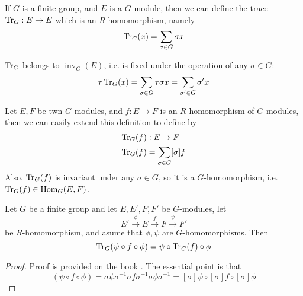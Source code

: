 \documentclass{article}
\begin{document}
\begin{defi}[Trace $\Tr_G$]
    If $G$ is a finite group, and $E$ is a $G$-module, then we can
    define the trace $\operatorname{Tr}_G:E\to E$ which is an $R$-homomorphism,
    namely
    \begin{equation}
        \operatorname{Tr}_G(x) = \sum_{\sigma\in G} \sigma x
    \end{equation}
\end{defi}
\begin{fact}
$\Tr_G$ belongs to $ \operatorname{inv}_G (E)$, i.e. is
fixed under the operation of any $\sigma\in G$:
\begin{align*}
    \tau \operatorname{Tr}_G(x) = \sum_{\sigma\in G} \tau \sigma x =
    \sum_{\sigma'\in G} \sigma' x
\end{align*}
\end{fact}
Let $E,F$ be twn $G$-modules, and $f:E\to F$ is an $R$-homomorphism of
$G$-modules, then we can easily extend this definition to define
 by
\begin{align}
    \operatorname{Tr}_G(f)&:E\to F \\
    \operatorname{Tr}_G(f) &= \sum_{\sigma\in G} [\sigma] f \nonumber
\end{align}
Also, $\operatorname{Tr}_G(f)$ is invariant under any $\sigma\in G$, so it is a
$G$-homomorphism, i.e.  $\operatorname{Tr}_G(f)\in \operatorname{Hom}_G(E,F)$.

\begin{prop}
    Let $G$ be a finite group and let $E,E',F,F'$ be $G$-modules, let
    \begin{equation*}
        E'\overset{\phi}{\to} E\overset{f}{\to} 
            F \overset{\psi}{\to} F'
    \end{equation*}
    be $R$-homomorphism, and asume that $\phi,\psi$ are
    $G$-homomorphisms. Then 
    \begin{equation}
        \operatorname{Tr}_G(\psi\circ f\circ\phi) = \psi\circ\operatorname{Tr}_G(f)\circ\phi
    \end{equation}
\end{prop}
\begin{proof}
    Proof is provided on the book \cite{lang-algebra}. The essential
    point is that
    \begin{equation}
        [\sigma] (\psi\circ f\circ\phi) = \sigma \psi \sigma^{-1}
        \sigma f \sigma^{-1} \sigma \phi \sigma^{-1} =
        [\sigma]\psi\circ [\sigma]f\circ [\sigma]\phi 
    \end{equation}
\end{proof}
\end{document}
